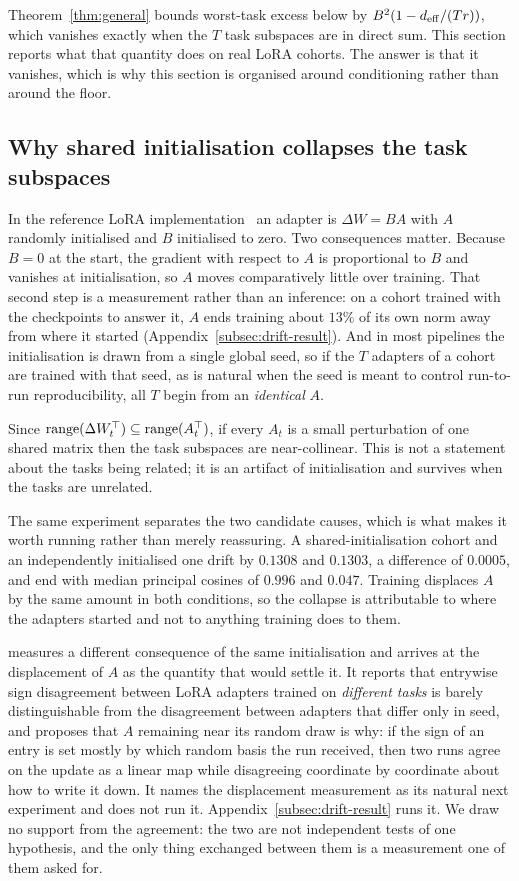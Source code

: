 Theorem~\ref{thm:general} bounds worst-task excess below by
$B^2(1 - d_{\mathrm{eff}}/(Tr))$, which vanishes exactly when the $T$ task subspaces are
in direct sum. This section reports what that quantity does on real LoRA
cohorts. The answer is that it vanishes, which is why this section is
organised around conditioning rather than around the floor.

\subsection{Why shared initialisation collapses the task subspaces}
\label{subsec:mechanism}

In the reference LoRA implementation~\citep{hu2022lora} an adapter is
$\Delta W = BA$ with $A$ randomly initialised and $B$ initialised to zero. Two
consequences matter. Because $B = 0$ at the start, the gradient with respect
to $A$ is proportional to $B$ and vanishes at initialisation, so $A$ moves
comparatively little over training. That second step is a measurement rather
than an inference: on a cohort trained with the checkpoints to answer it, $A$
ends training about $13\%$ of its own norm away from where it started
(Appendix~\ref{subsec:drift-result}). And in most pipelines the initialisation
is drawn from a single global seed, so if the $T$ adapters of a cohort are
trained with that seed, as is natural when the seed is meant to control
run-to-run reproducibility, all $T$ begin from an \emph{identical} $A$.

Since $\operatorname{range}(\Delta W_t^\top) \subseteq \operatorname{range}(A_t^\top)$, if every $A_t$ is
a small perturbation of one shared matrix then the task subspaces are
near-collinear. This is not a statement about the tasks being related; it is
an artifact of initialisation and survives when the tasks are unrelated.

The same experiment separates the two candidate causes, which is what makes it
worth running rather than merely reassuring. A shared-initialisation cohort and
an independently initialised one drift by $0.1308$ and $0.1303$, a difference
of $0.0005$, and end with median principal cosines of $0.996$ and $0.047$.
Training displaces $A$ by the same amount in both conditions, so the collapse
is attributable to where the adapters started and not to anything training
does to them.

\citet{concurrentanon} measures a different consequence of the same
initialisation and arrives at the displacement of $A$ as the quantity that
would settle it. It reports that entrywise sign disagreement between LoRA
adapters trained on \emph{different tasks} is barely distinguishable from the
disagreement between adapters that differ only in seed, and proposes that $A$
remaining near its random draw is why: if the sign of an entry is set mostly
by which random basis the run received, then two runs agree on the update as a
linear map while disagreeing coordinate by coordinate about how to write it
down. It names the displacement measurement as its natural next experiment and
does not run it. Appendix~\ref{subsec:drift-result} runs it. We draw no
support from the agreement: the two are not independent tests of one
hypothesis, and the only thing exchanged between them is a measurement one of
them asked for.

